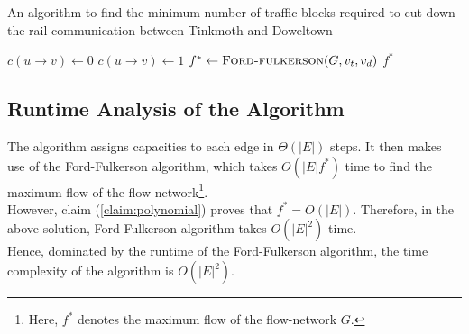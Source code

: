 \documentclass[12pt]{report}
\begin{document}
    \begin{algorithm}[H]
        \caption{An algorithm to find the minimum number of traffic blocks required to cut down the rail communication between Tinkmoth and Doweltown}
        \label{alg:min-traffic-blocks}
        \begin{algorithmic}[1]
                    \State $c(u \to v) \gets 0$
                \Else
                    \State $c(u \to v) \gets 1$
                \EndIf
            \EndFor
            \State $f^{*} \gets \Call{Ford-fulkerson}{G, v_{t}, v_{d}}$
            \State \Return $f^{*}$
            \EndProcedure
        \end{algorithmic}
    \end{algorithm}

    \subsection*{Runtime Analysis of the Algorithm}
    The algorithm assigns capacities to each edge in $\Theta(|E|)$ steps.
    It then makes use of the Ford-Fulkerson algorithm, which takes $O(|E| f^{*})$ time to find the maximum flow of the flow-network\footnote{
        Here, $f^{*}$ denotes the maximum flow of the flow-network $G$.
    }. \\
    However, claim (\ref{claim:polynomial}) proves that $f^{*} = O(|E|)$.
    Therefore, in the above solution, Ford-Fulkerson algorithm takes $O(|E|^{2})$ time.
    \vspace*{10pt} \\
    Hence, dominated by the runtime of the Ford-Fulkerson algorithm, the time complexity of the algorithm is $O(|E|^{2})$.
\end{document}
